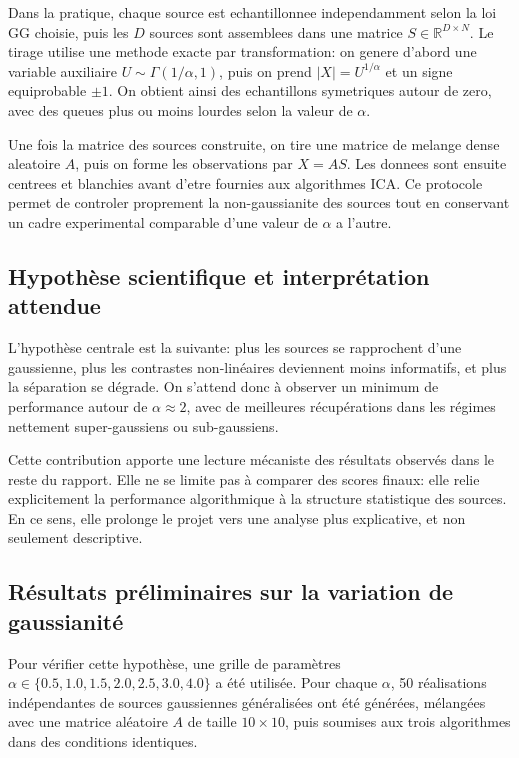 \documentclass[11pt,a4paper]{article}
\begin{document}
Dans la pratique, chaque source est echantillonnee independamment selon la loi GG choisie, puis les $D$ sources sont assemblees dans une matrice $S \in \mathbb{R}^{D \times N}$. Le tirage utilise une methode exacte par transformation: on genere d'abord une variable auxiliaire $U \sim \Gamma(1/\alpha, 1)$, puis on prend $|X| = U^{1/\alpha}$ et un signe equiprobable $\pm 1$. On obtient ainsi des echantillons symetriques autour de zero, avec des queues plus ou moins lourdes selon la valeur de $\alpha$.

Une fois la matrice des sources construite, on tire une matrice de melange dense aleatoire $A$, puis on forme les observations par $X = AS$. Les donnees sont ensuite centrees et blanchies avant d'etre fournies aux algorithmes ICA. Ce protocole permet de controler proprement la non-gaussianite des sources tout en conservant un cadre experimental comparable d'une valeur de $\alpha$ a l'autre.

\subsection{Hypothèse scientifique et interprétation attendue}

L'hypothèse centrale est la suivante: plus les sources se rapprochent d'une gaussienne, plus les contrastes non-linéaires deviennent moins informatifs, et plus la séparation se dégrade. On s'attend donc à observer un minimum de performance autour de $\alpha \approx 2$, avec de meilleures récupérations dans les régimes nettement super-gaussiens ou sub-gaussiens.

Cette contribution apporte une lecture mécaniste des résultats observés dans le reste du rapport. Elle ne se limite pas à comparer des scores finaux: elle relie explicitement la performance algorithmique à la structure statistique des sources. En ce sens, elle prolonge le projet vers une analyse plus explicative, et non seulement descriptive.

\subsection{Résultats préliminaires sur la variation de gaussianité}

Pour vérifier cette hypothèse, une grille de paramètres $\alpha \in \{0.5, 1.0, 1.5, 2.0, 2.5, 3.0, 4.0\}$ a été utilisée. Pour chaque $\alpha$, 50 réalisations indépendantes de sources gaussiennes généralisées ont été générées, mélangées avec une matrice aléatoire $A$ de taille $10 \times 10$, puis soumises aux trois algorithmes dans des conditions identiques.
\end{document}
